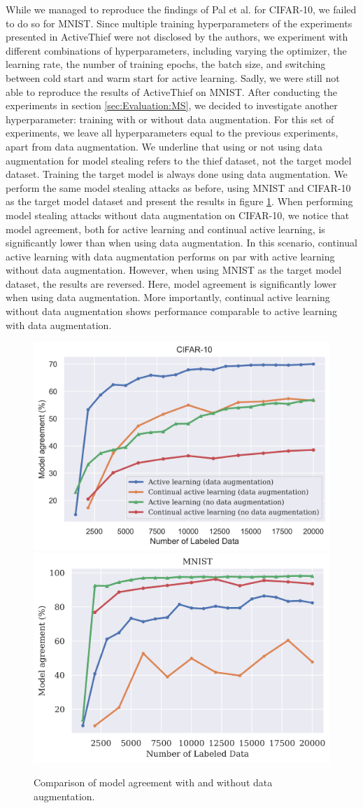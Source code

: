 While we managed to reproduce the findings of Pal et al. for CIFAR-10, we failed to do so for MNIST. Since multiple training hyperparameters of the experiments
presented in ActiveThief were not disclosed by the authors, we experiment with different combinations of hyperparameters, including varying the optimizer,
the learning rate, the number of training epochs, the batch size, and switching between cold start and warm start for active learning. Sadly, we were still
not able to reproduce the results of ActiveThief on MNIST. After conducting the experiments in section \ref{sec:Evaluation:MS}, we decided to investigate
another hyperparameter: training with or without data augmentation. For this set of experiments, we leave all hyperparameters equal to the previous experiments,
apart from data augmentation. We underline that using or not using data augmentation for model stealing refers to the thief dataset, not the target
model dataset. Training the target model is always done using data augmentation. We perform the same model stealing attacks as before, using MNIST and
CIFAR-10 as the target model dataset and present the results in figure \ref{fig:Evaluation:Results:CAL:EffectAugmentation}. When performing model stealing attacks
without data augmentation on CIFAR-10, we notice that model agreement, both for active learning and continual active learning, is significantly lower than
when using data augmentation. In this scenario, continual active learning with data augmentation performs on par with active learning without data augmentation.
However, when using MNIST as the target model dataset, the results are reversed. Here, model agreement is significantly lower when using data augmentation.
More importantly, continual active learning without data augmentation shows performance comparable to active learning with data augmentation. \par

\begin{figure}[h]
    \centering
    \includegraphics[width=0.48\linewidth]{images/results_CALMS/data_augmentation_cifar.png} \hfill
    \includegraphics[width=0.48\linewidth]{images/results_CALMS/data_augmentation_mnist.png}
    \caption{Comparison of model agreement with and without data augmentation.}
    \label{fig:Evaluation:Results:CAL:EffectAugmentation}
\end{figure}

